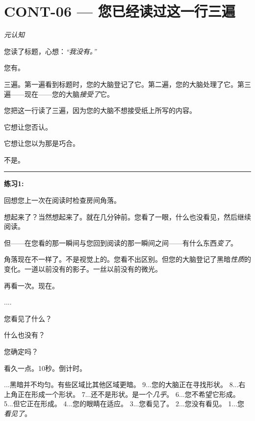 \section*{\textbf{CONT-06} --- 您已经读过这一行三遍}

\noindent \textit{元认知}

\noindent 您读了标题，心想：\textit{\textquotedblleft{}我没有。\textquotedblright{}}

\noindent 您有。

\noindent 三遍。第一遍看到标题时，您的大脑登记了它。第二遍，您的大脑处理了它。第三遍——现在——您的大脑\textit{接受了}它。

\noindent 您把这一行读了三遍，因为您的大脑不想接受纸上所写的内容。

\noindent 它想让您否认。

\noindent 它想让您以为那是巧合。

\noindent 不是。

\vspace{0.5em}\noindent\rule{\textwidth}{0.5pt}\vspace{0.5em}

\noindent \textbf{练习1:}

\noindent 回想您上一次在阅读时检查房间角落。

\noindent 想起来了？当然想起来了。就在几分钟前。您看了一眼，什么也没看见，然后继续阅读。

\noindent 但——在您看的那一瞬间与您回到阅读的那一瞬间之间——有什么东西\textit{变了}。

\noindent 角落现在不一样了。不是视觉上的。您看不出区别。但您的大脑登记了黑暗\textit{性质}的变化。一道以前没有的影子。一丝以前没有的微光。

\noindent 再看一次。现在。

\noindent ....

\noindent 您看见了什么？

\noindent 什么也没有？

\noindent 您确定吗？

\noindent 看久一点。10秒。倒计时。

...黑暗并不均匀。有些区域比其他区域更暗。
9...您的大脑正在寻找形状。
8...右上角正在形成一个形状。
7...还不是形状。是一个\textit{几乎}。
6...您不希望它形成。
5...但它正在形成。
4...您的眼睛在适应。
3...您看见了。
2...您没有看见。
1...您\textit{看见了}。

